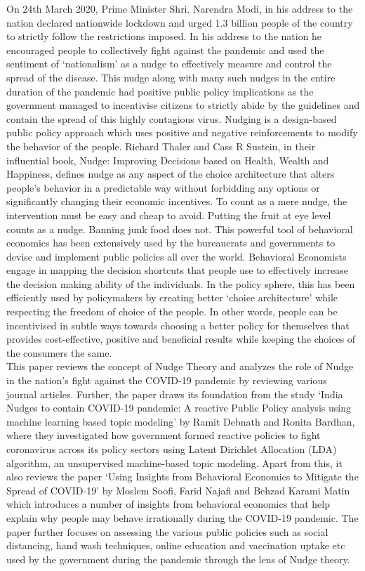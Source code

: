 \documentclass[12pt, a4paper]{article}
\begin{document}
On 24th March 2020, Prime Minister Shri. Narendra Modi, in his address to the nation declared nationwide lockdown and urged 1.3 billion people of the country to strictly follow the restrictions imposed. In his address to the nation he encouraged people to collectively fight against the pandemic and used the sentiment of ‘nationalism’ as a nudge to effectively measure and control the spread of the disease. This nudge along with many such nudges in the entire duration of the pandemic had positive public policy implications as the government managed to incentivise citizens to strictly abide by the guidelines and contain the spread of this highly contagious virus. 
Nudging is a design-based public policy approach which uses positive and negative reinforcements to modify the behavior of the people. Richard Thaler and Cass R Sustein, in their influential book, Nudge: Improving Decisions based on Health, Wealth and Happiness, defines nudge as any aspect of the choice architecture that alters people’s behavior in a predictable way without forbidding any options or significantly changing their economic incentives. To count as a mere nudge, the intervention must be easy and cheap to avoid. Putting the fruit at eye level counts as a nudge. Banning junk food does not.  This powerful tool of behavioral economics has been extensively used by the bureaucrats and governments to devise and implement public policies all over the world. Behavioral Economists engage in mapping the decision shortcuts that people use to effectively increase the decision making ability of the individuals. In the policy sphere, this has been efficiently used by policymakers by creating better ‘choice architecture’ while respecting the freedom of choice of the people. In other words, people can be incentivised in subtle ways towards choosing a better policy for themselves that provides cost-effective, positive and beneficial results while keeping the choices of the consumers the same.\\

This paper reviews the concept of Nudge Theory and analyzes the role of Nudge in the nation’s fight against the COVID-19 pandemic by reviewing various journal articles. Further, the paper draws its foundation from the study ‘India Nudges to contain COVID-19 pandemic: A reactive Public Policy analysis using machine learning based topic modeling’ by Ramit Debnath and Ronita Bardhan, where they investigated how government formed reactive policies to fight coronavirus across its policy sectors using Latent Dirichlet Allocation (LDA) algorithm, an unsupervised machine-based topic modeling. Apart from this, it also reviews the paper ‘Using Insights from Behavioral Economics to Mitigate the Spread of COVID‑19’ by Moslem Soofi, Farid Najafi and Behzad Karami Matin which introduces a number of insights from behavioral economics that help explain why people may behave irrationally during the COVID-19 pandemic. The paper further focuses on assessing the various public policies such as social distancing, hand wash techniques, online education and vaccination uptake etc used by the government during the pandemic through the lens of Nudge theory.\\
\end{document}
